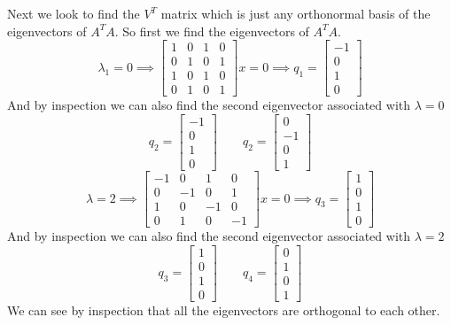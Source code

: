 \documentclass{article}
\begin{document}
\newline
Next we look to find the $V^T$ matrix which is just any orthonormal basis of the eigenvectors of $A^TA$.
So first we find the eigenvectors of $A^TA$.
$$\lambda_1 = 0 \implies
\begin{bmatrix}
1 & 0 & 1 & 0 \\
0 & 1 & 0 & 1 \\
1 & 0 & 1 & 0 \\
0 & 1 & 0 & 1
\end{bmatrix}
x=0
\implies
q_1
=
\begin{bmatrix}
-1\\
0\\
1\\
0
\end{bmatrix}
$$
And by inspection we can also find the second eigenvector associated with $\lambda = 0$
$$
q_2
=
\begin{bmatrix}
-1\\
0\\
1\\
0
\end{bmatrix}
\qquad
q_2
=
\begin{bmatrix}
0\\
-1\\
0\\
1
\end{bmatrix}
$$
$$\lambda = 2 \implies
\begin{bmatrix}
-1 & 0 & 1 & 0 \\
0 & -1 & 0 & 1 \\
1 & 0 & -1 & 0 \\
0 & 1 & 0 & -1
\end{bmatrix}
x=0
\implies
q_3
=
\begin{bmatrix}
1\\
0\\
1\\
0
\end{bmatrix}
$$
And by inspection we can also find the second eigenvector associated with $\lambda = 2$
$$
q_3
=
\begin{bmatrix}
1\\
0\\
1\\
0
\end{bmatrix}
\qquad
q_4
=
\begin{bmatrix}
0\\
1\\
0\\
1
\end{bmatrix}
$$
We can see by inspection that all the eigenvectors are orthogonal to each other.
\end{document}
